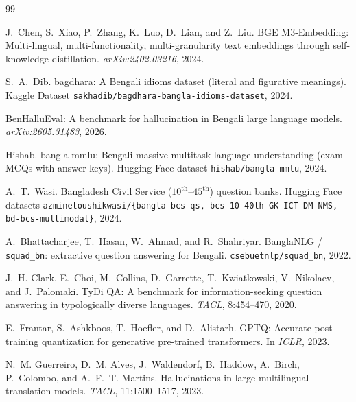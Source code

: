 \documentclass[11pt]{article}
\begin{document}
{\small

\begin{thebibliography}{99}
\setlength{\itemsep}{1pt}

J.~Chen, S.~Xiao, P.~Zhang, K.~Luo, D.~Lian, and Z.~Liu.
\newblock BGE M3-Embedding: Multi-lingual, multi-functionality, multi-granularity
text embeddings through self-knowledge distillation.
\newblock \emph{arXiv:2402.03216}, 2024.

S.~A.~Dib.
\newblock bagdhara: A Bengali idioms dataset (literal and figurative meanings).
\newblock Kaggle Dataset \texttt{sakhadib/bagdhara-bangla-idioms-dataset}, 2024.

BenHalluEval: A benchmark for hallucination in Bengali large language models.
\newblock \emph{arXiv:2605.31483}, 2026.

Hishab.
\newblock bangla-mmlu: Bengali massive multitask language understanding (exam MCQs with answer keys).
\newblock Hugging Face dataset \texttt{hishab/bangla-mmlu}, 2024.

A.~T.~Wasi.
\newblock Bangladesh Civil Service ($10^{\text{th}}$--$45^{\text{th}}$) question banks.
\newblock Hugging Face datasets \texttt{azminetoushikwasi/\{bangla-bcs-qs,
bcs-10-40th-GK-ICT-DM-NMS, bd-bcs-multimodal\}}, 2024.

A.~Bhattacharjee, T.~Hasan, W.~Ahmad, and R.~Shahriyar.
\newblock BanglaNLG / \texttt{squad\_bn}: extractive question answering for Bengali.
\newblock \texttt{csebuetnlp/squad\_bn}, 2022.

J.~H. Clark, E.~Choi, M.~Collins, D.~Garrette, T.~Kwiatkowski, V.~Nikolaev,
and J.~Palomaki.
\newblock TyDi QA: A benchmark for information-seeking question answering in
typologically diverse languages.
\newblock \emph{TACL}, 8:454--470, 2020.

E.~Frantar, S.~Ashkboos, T.~Hoefler, and D.~Alistarh.
\newblock GPTQ: Accurate post-training quantization for generative pre-trained
transformers.
\newblock In \emph{ICLR}, 2023.

N.~M. Guerreiro, D.~M. Alves, J.~Waldendorf, B.~Haddow, A.~Birch, P.~Colombo,
and A.~F.~T. Martins.
\newblock Hallucinations in large multilingual translation models.
\newblock \emph{TACL}, 11:1500--1517, 2023.


\end{thebibliography}}
\end{document}
